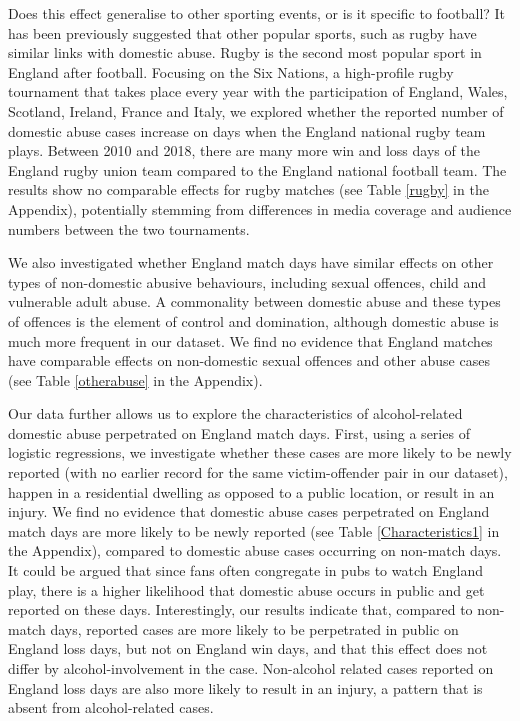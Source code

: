 \documentclass[12pt, letterpaper]{article}
\begin{document}
Does this effect generalise to other sporting events, or is it specific to football?
It has been previously suggested that other popular sports, such as rugby have similar links with domestic abuse\autocite{Brooks-Hay2018}. Rugby is the second most popular sport in England after football\autocite{Ipsos2003}. Focusing on the Six Nations, a high-profile rugby tournament that takes place every year with the participation of England, Wales, Scotland, Ireland, France and Italy, we explored whether the reported number of domestic abuse cases increase on days when the England national rugby team plays. Between 2010 and 2018, there are many more win and loss days of the England rugby union team compared to the England national football team. The results show no comparable effects for rugby matches (see Table \ref{rugby} in the Appendix), potentially stemming from differences in media coverage and audience numbers between the two tournaments. 

We also investigated whether England match days have similar effects on other types of non-domestic abusive behaviours, including sexual offences, child and vulnerable adult abuse. A commonality between domestic abuse and these types of offences is the element of control and domination, although domestic abuse is much more frequent in our dataset. We find no evidence that England matches have comparable effects on non-domestic sexual offences and other abuse cases (see Table \ref{otherabuse} in the Appendix). 

Our data further allows us to explore the characteristics of alcohol-related domestic abuse perpetrated on England match days. First, using a series of logistic regressions, we investigate whether these cases are more likely to be newly reported (with no earlier record for the same victim-offender pair in our dataset), happen in a residential dwelling as opposed to a public location, or result in an injury. We find no evidence that domestic abuse cases perpetrated on England match days are more likely to be newly reported (see Table \ref{Characteristics1} in the Appendix), compared to domestic abuse cases occurring on non-match days. It could be argued that since fans often congregate in pubs to watch England play, there is a higher likelihood that domestic abuse occurs in public and get reported on these days. Interestingly, our results indicate that, compared to non-match days, reported cases are more likely to be perpetrated in public on England loss days, but not on England win days, and that this effect does not differ by alcohol-involvement in the case. Non-alcohol related cases reported on England loss days are also more likely to result in an injury, a pattern that is absent from alcohol-related cases.
\end{document}
